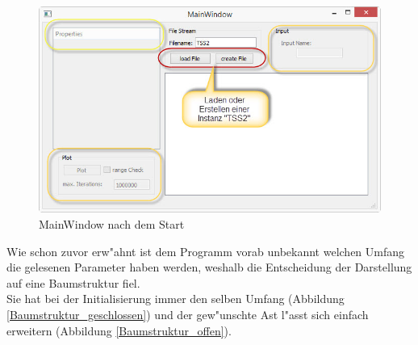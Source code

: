 \documentclass[11pt, a4paper, german]{article}
\theoremstyle{plain}
\begin{document}
	\begin{figure}[H]
		\centering
		\includegraphics[width=1\linewidth]{./Pictures/MainWindow_Start}
		\caption[Startwindow]{MainWindow nach dem Start}
		\label{MainWindow_Start}
	\end{figure}
	Wie schon zuvor erw"ahnt ist dem Programm vorab unbekannt welchen Umfang die gelesenen Parameter haben werden, weshalb die Entscheidung der Darstellung auf eine Baumstruktur fiel.\\
	Sie hat bei der Initialisierung immer den selben Umfang (Abbildung \ref{Baumstruktur_geschlossen}) und der gew"unschte Ast l"asst sich einfach erweitern (Abbildung \ref{Baumstruktur_offen}).
\end{document}
